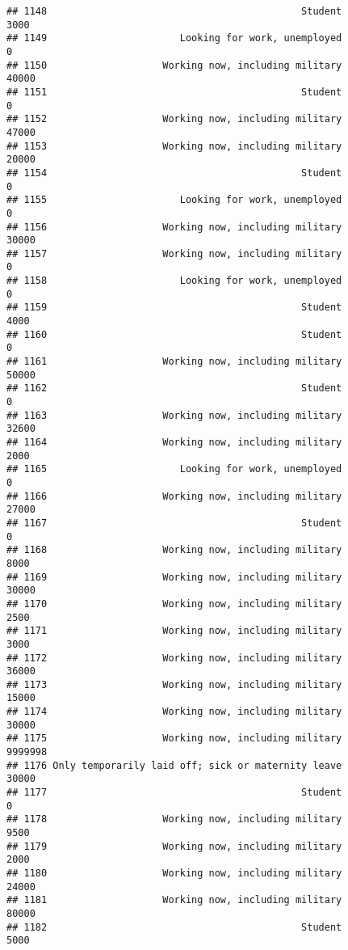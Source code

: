 \documentclass[]{book}
\theoremstyle{definition}
\theoremstyle{definition}
\theoremstyle{remark}
\begin{document}
\begin{verbatim}
## 1148                                            Student            3000
## 1149                       Looking for work, unemployed               0
## 1150                    Working now, including military           40000
## 1151                                            Student               0
## 1152                    Working now, including military           47000
## 1153                    Working now, including military           20000
## 1154                                            Student               0
## 1155                       Looking for work, unemployed               0
## 1156                    Working now, including military           30000
## 1157                    Working now, including military               0
## 1158                       Looking for work, unemployed               0
## 1159                                            Student            4000
## 1160                                            Student               0
## 1161                    Working now, including military           50000
## 1162                                            Student               0
## 1163                    Working now, including military           32600
## 1164                    Working now, including military            2000
## 1165                       Looking for work, unemployed               0
## 1166                    Working now, including military           27000
## 1167                                            Student               0
## 1168                    Working now, including military            8000
## 1169                    Working now, including military           30000
## 1170                    Working now, including military            2500
## 1171                    Working now, including military            3000
## 1172                    Working now, including military           36000
## 1173                    Working now, including military           15000
## 1174                    Working now, including military           30000
## 1175                    Working now, including military         9999998
## 1176 Only temporarily laid off; sick or maternity leave           30000
## 1177                                            Student               0
## 1178                    Working now, including military            9500
## 1179                    Working now, including military            2000
## 1180                    Working now, including military           24000
## 1181                    Working now, including military           80000
## 1182                                            Student            5000

\end{verbatim}
\end{document}
